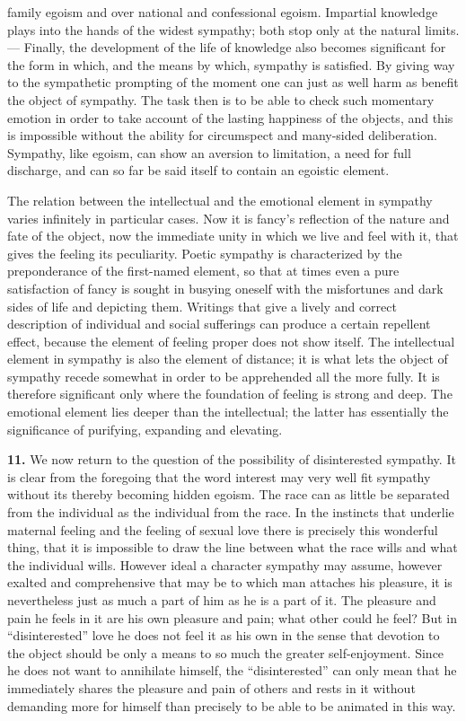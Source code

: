 \documentclass[12pt,a4paper]{book}
\newcommand{\opage}[1]{\marginnote{\footnotesize\textit{[#1]}}}
\begin{document}
family egoism and over national and confessional egoism. Impartial
knowledge plays into the hands of the widest sympathy; both stop only
at the natural limits. --- Finally, the development of the life of
knowledge also becomes significant for the form in which, and the means
by which, sympathy is satisfied. By giving way to the sympathetic
prompting of the moment one can just as well harm as benefit the object
of sympathy. The task then is to be able to check such momentary
emotion in order to take account of the lasting happiness of the
objects, and this is impossible without the ability for circumspect and
many-sided deliberation. Sympathy, like egoism, can show an aversion to
limitation, a need for full discharge, and can so far be said itself to
contain an egoistic element.

The relation between the intellectual and the emotional element in
sympathy varies infinitely in particular cases. Now it is fancy's
reflection of the nature and fate of the object, now the immediate unity
in which we live and feel with it, that gives the feeling its
peculiarity. Poetic sympathy is characterized by the preponderance of
the first-named element, so that at times even a pure satisfaction of
fancy is sought in busying oneself with the misfortunes and dark sides
of life and depicting them. Writings that give a lively and correct
description of individual and social sufferings can produce a certain
repellent effect, because the element of feeling proper does not show
itself. The intellectual element in sympathy is also the element of
distance; it is what lets the object of sympathy recede somewhat in
order to be apprehended all the more fully. It is therefore significant
only where the foundation of feeling is strong and deep. The emotional
element lies deeper
\opage{308}than the intellectual; the latter has essentially the
significance of purifying, expanding and elevating.

\textbf{11.} We now return to the question of the possibility of
disinterested sympathy. It is clear from the foregoing that the word
interest may very well fit sympathy without its thereby becoming hidden
egoism. The race can as little be separated from the individual as the
individual from the race. In the instincts that underlie maternal
feeling and the feeling of sexual love there is precisely this wonderful
thing, that it is impossible to draw the line between what the race
wills and what the individual wills. However ideal a character sympathy
may assume, however exalted and comprehensive that may be to which man
attaches his pleasure, it is nevertheless just as much a part of him as
he is a part of it. The pleasure and pain he feels in it are his own
pleasure and pain; what other could he feel? But in ``disinterested''
love he does not feel it as his own in the sense that devotion to the
object should be only a means to so much the greater self-enjoyment.
Since he does not want to annihilate himself, the ``disinterested'' can
only mean that he immediately shares the pleasure and pain of others and
rests in it without demanding more for himself than precisely to be able
to be animated in this way.
\end{document}
